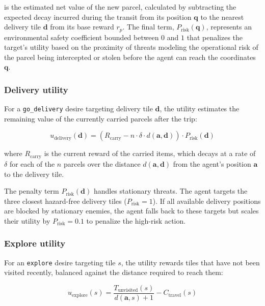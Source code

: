 is the estimated net value of the new parcel, calculated by subtracting the expected decay incurred during the transit from its position $\mathbf{q}$ to the nearest delivery tile $\mathbf{d}$ from its base reward $r_p$. The final term, $P_{\text{risk}}(\mathbf{q})$, represents an environmental safety coefficient bounded between $0$ and $1$ that penalizes the target's utility based on the proximity of threats modeling the operational risk of the parcel being intercepted or stolen before the agent can reach the coordinates $\mathbf{q}$.

\subsubsection{Delivery utility}\label{sec:delivery_utility}
For a \texttt{go\_delivery} desire targeting delivery tile $\mathbf{d}$, the
utility estimates the remaining value of the currently carried parcels after
the trip:

\vspace{-1em}
\begin{equation}
u_{\text{delivery}}(\mathbf{d}) =
  (R_{\text{carry}} - n \cdot \delta \cdot d(\mathbf{a}, \mathbf{d})) \cdot P_{\text{risk}}(\mathbf{d})
\label{eq:delivery_utility}
\end{equation}
\vspace{-1em}

where $R_{\text{carry}}$ is the current reward of the carried items, which decays at a rate of $\delta$ for each of the $n$ parcels over the distance $d(\mathbf{a}, \mathbf{d})$ from the agent's position $\mathbf{a}$ to the delivery tile. 

The penalty term $P_{\text{risk}}(\mathbf{d})$ handles stationary threats. The agent targets the three closest hazard-free delivery tiles ($P_{\text{risk}} = 1$). If all available delivery positions are blocked by stationary enemies, the agent falls back to these targets but scales their utility by $P_{\text{risk}} = 0.1$ to penalize the high-risk action.

\subsubsection{Explore utility}\label{sec:explore_utility}
For an \texttt{explore} desire targeting tile $s$, the utility rewards tiles that have not been visited recently, balanced against the distance required to reach them:

\vspace{-1em}
\begin{equation}
u_{\text{explore}}(s) =
  \frac{T_{\text{unvisited}}(s)}{d(\mathbf{a},s) + 1} - C_{\text{travel}}(s)
\label{eq:explore_utility}
\end{equation}
\vspace{-1em}

